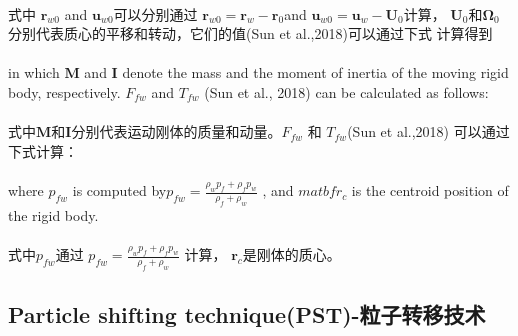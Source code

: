 \documentclass[UTF8]{ctexart}
\begin{document}
{{\paragraph{\quad}式中 $\mathbf{r}_{w0}$ and $\mathbf{u}_{w0}$可以分别通过
                    $\mathbf{r}_{w0} = \mathbf{r}_w-\mathbf{r}_0 $and $\mathbf{u}_{w0} = \mathbf{u}_w-\mathbf{U}_0$计算，
                    $\mathbf{U}_0$和$\mathbf{\Omega}_0$分别代表质心的平移和转动，它们的值(Sun et al.,2018)可以通过下式
                    计算得到


\paragraph{\quad}in which $\mathbf{M}$ and $\mathbf{I}$ denote the mass and the moment of 
                inertia of the moving rigid body, 
                respectively. $F_{fw}$ and $T_{fw}$ (Sun et al., 2018) can be calculated as follows:
\paragraph{\quad}式中$\mathbf{M}$和$\mathbf{I}$分别代表运动刚体的质量和动量。$F_{fw}$ 和 $T_{fw}$(Sun et al.,2018)
                可以通过下式计算：


\paragraph{\quad}where $p_{fw}$ is computed by$ p_{fw} = \frac{\rho_w p_f +\rho_f p_w}{ \rho_f +\rho_w}$ , 
                and $matbf{r}_c$ is the centroid position of the rigid body.
\paragraph{\quad}式中$p_{fw}$通过 $ p_{fw} = \frac{\rho_w p_f +\rho_f p_w}{ \rho_f +\rho_w}$ 计算，
                $\mathbf{r}_c$是刚体的质心。

\subsection{Particle shifting technique(PST)-粒子转移技术}
}}
\end{document}
